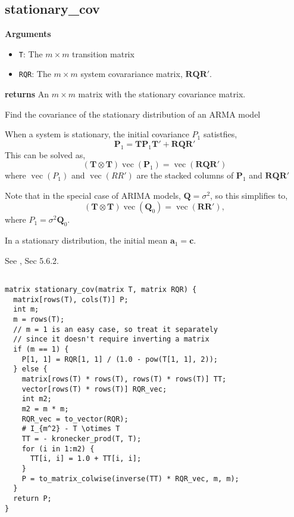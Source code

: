 \documentclass[]{book}
\providecommand{\tightlist}{%
  \setlength{\itemsep}{0pt}\setlength{\parskip}{0pt}}
\DeclareMathOperator{\VEC}{vec}
\newcommand{\mat}[1]{\boldsymbol{#1}}
\renewcommand{\vec}[1]{\boldsymbol{#1}}
\renewcommand{\T}{'}
\begin{document}
\subsection{stationary\_cov}\label{stationary_cov}

\textbf{Arguments}

\begin{itemize}
\tightlist
\item
  \texttt{T}: The \(m \times m\) transition matrix
\item
  \texttt{RQR}: The \(m \times m\) system covarariance matrix,
  \(\mat{R} \mat{Q} \mat{R}\T\).
\end{itemize}

\textbf{returns} An \(m \times m\) matrix with the stationary covariance
matrix.

Find the covariance of the stationary distribution of an ARMA model

When a system is stationary, the initial covariance \(P_1\) satistfies,
\[
\mat{P}_1 = \mat{T} \mat{P}_1 \mat{T}\T + \mat{R} \mat{Q} \mat{R}\T
\] This can be solved as, \[
(\mat{T} \otimes \mat{T}) \VEC(\mat{P}_1) = \VEC(\mat{R} \mat{Q} \mat{R}\T)
\] where \(\VEC(P_1)\) and \(\VEC(R R')\) are the stacked columns of
\(\mat{P}_1\) and \(\mat{R} \mat{Q} \mat{R}\T\)

Note that in the special case of ARIMA models, \(\mat{Q} = \sigma^2\),
so this simplifies to, \[
(\mat{T} \otimes \mat{T}) \VEC(\mat{Q}_0) = \VEC(\mat{R} \mat{R}\T),
\] where \(P_1 = \sigma^2 \mat{Q}_0\).

In a stationary distribution, the initial mean \(\vec{a}_1 = \vec{c}\).

See \textcite{DurbinKoopman2012}, Sec 5.6.2.

\begin{verbatim}

matrix stationary_cov(matrix T, matrix RQR) {
  matrix[rows(T), cols(T)] P;
  int m;
  m = rows(T);
  // m = 1 is an easy case, so treat it separately
  // since it doesn't require inverting a matrix
  if (m == 1) {
    P[1, 1] = RQR[1, 1] / (1.0 - pow(T[1, 1], 2));
  } else {
    matrix[rows(T) * rows(T), rows(T) * rows(T)] TT;
    vector[rows(T) * rows(T)] RQR_vec;
    int m2;
    m2 = m * m;
    RQR_vec = to_vector(RQR);
    # I_{m^2} - T \otimes T
    TT = - kronecker_prod(T, T);
    for (i in 1:m2) {
      TT[i, i] = 1.0 + TT[i, i];
    }
    P = to_matrix_colwise(inverse(TT) * RQR_vec, m, m);
  }
  return P;
}
\end{verbatim}
\end{document}
